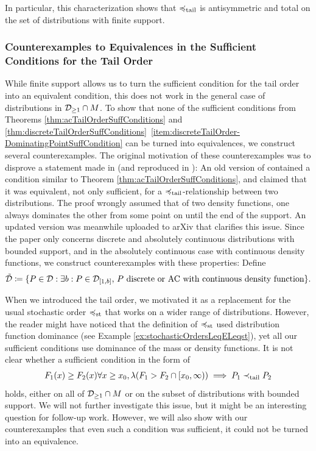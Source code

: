 \documentclass[a4paper,DIV=11]{scrreprt}
\newcommand{\M}{M}
\theoremstyle{definition}
\begin{document}
    In particular, this characterization shows that $\preccurlyeq_{\text{tail}}$ is antisymmetric and total on the set of distributions with finite support.
    
    \subsubsection{Counterexamples to Equivalences in the Sufficient Conditions for the Tail Order}
    \newcommand{\DRass}{\tilde{\DP}}
    While finite support allows us to turn the sufficient condition for the tail order into an equivalent condition, this does not work in the general case of distributions in $\Dgeqone \cap \M$.
    To show that none of the sufficient conditions from Theorems \ref{thm:acTailOrderSuffConditions} and \ref{thm:discreteTailOrderSuffConditions}\, \ref{item:discreteTailOrder-DominatingPointSuffCondition} can be turned into equivalences, we construct several counterexamples.
    The original motivation of these counterexamples was to disprove a statement made in \cite{bib:rassGameRiskManagI} (and reproduced in \cite{bib:rassTotalOrderingOnLossDistributions}): 
    An old version of \cite{bib:rassGameRiskManagI} contained a condition similar to Theorem \ref{thm:acTailOrderSuffConditions}, and claimed that it was equivalent, not only sufficient, for a $\preccurlyeq_{\text{tail}}$-relationship between two distributions. The proof wrongly assumed that of two density functions, one always dominates the other from some point on until the end of the support.
    An updated version was meanwhile uploaded to arXiv that clarifies this issue. Since the paper only concerns discrete and absolutely continuous distributions with bounded support, and in the absolutely continuous case with continuous density functions, we construct counterexamples with these properties: Define 
    \begin{gather*}
        \DRass \coloneqq \set{P \in \DP: \text{$\exists b: P \in \DP_{[1, b]}$, $P$ discrete or AC with continuous density function}}.
    \end{gather*}
    
    When we introduced the tail order, we motivated it as a replacement for the usual stochastic order $\preccurlyeq_{\text{st}}$ that works on a wider range of distributions.
    However, the reader might have noticed that the definition of $\preccurlyeq_{\text{st}}$ used distribution function dominance (see Example \ref{ex:stochasticOrdersLeqELeqst}), yet all our sufficient conditions use dominance of the mass or density functions.
    It is not clear whether a sufficient condition in the form of 
    \begin{gather*}
        F_1(x) \geq F_2(x) \forall x \geq x_0, \lambda({F_1 > F_2} \cap [x_0, \infty)) \implies P_1 \prec_{\text{tail}} P_2
    \end{gather*}
    holds, either on all of $\mathcal{D}_{\geq1} \cap M$ or on the subset of distributions with bounded support.
    We will not further investigate this issue, but it might be an interesting question for follow-up work.
    However, we will also show with our counterexamples that even such a condition was sufficient, it could not be turned into an equivalence.
    
\end{document}
